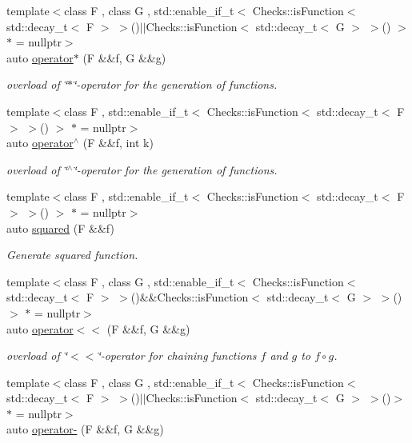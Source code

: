 \begin{DoxyCompactItemize}
{\footnotesize template$<$class F , class G , std\-::enable\-\_\-if\-\_\-t$<$ Checks\-::is\-Function$<$ std\-::decay\-\_\-t$<$ F $>$ $>$()$|$$|$\-Checks\-::is\-Function$<$ std\-::decay\-\_\-t$<$ G $>$ $>$() $>$ $\ast$  = nullptr$>$ }\\auto \hyperlink{namespaceFunG_a267562e725c73ece1c1d057b5f29511f}{operator$\ast$} (\-F \&\&f, \-G \&\&g)
\begin{DoxyCompactList}\small\item\em overload of \char`\"{}$\ast$\char`\"{}-\/operator for the generation of functions. \end{DoxyCompactList}\item 
{\footnotesize template$<$class F , std\-::enable\-\_\-if\-\_\-t$<$ Checks\-::is\-Function$<$ std\-::decay\-\_\-t$<$ F $>$ $>$() $>$ $\ast$  = nullptr$>$ }\\auto \hyperlink{namespaceFunG_a94273e3ea80324e591bb98ae3c051221}{operator$^\wedge$} (\-F \&\&f, int k)
\begin{DoxyCompactList}\small\item\em overload of \char`\"{}$^\wedge$\char`\"{}-\/operator for the generation of functions. \end{DoxyCompactList}\item 
{\footnotesize template$<$class F , std\-::enable\-\_\-if\-\_\-t$<$ Checks\-::is\-Function$<$ std\-::decay\-\_\-t$<$ F $>$ $>$() $>$ $\ast$  = nullptr$>$ }\\auto \hyperlink{namespaceFunG_ac4ffc0754104af6ddf114e154251db78}{squared} (\-F \&\&f)
\begin{DoxyCompactList}\small\item\em \-Generate squared function. \end{DoxyCompactList}\item 
{\footnotesize template$<$class F , class G , std\-::enable\-\_\-if\-\_\-t$<$ Checks\-::is\-Function$<$ std\-::decay\-\_\-t$<$ F $>$ $>$()\&\&\-Checks\-::is\-Function$<$ std\-::decay\-\_\-t$<$ G $>$ $>$() $>$ $\ast$  = nullptr$>$ }\\auto \hyperlink{namespaceFunG_a65436d4494e99629b0177d0df7634a6b}{operator$<$$<$} (\-F \&\&f, \-G \&\&g)
\begin{DoxyCompactList}\small\item\em overload of \char`\"{}$<$$<$\char`\"{}-\/operator for chaining functions $f$ and $g$ to $ f \circ g $. \end{DoxyCompactList}\item 
{\footnotesize template$<$class F , class G , std\-::enable\-\_\-if\-\_\-t$<$ Checks\-::is\-Function$<$ std\-::decay\-\_\-t$<$ F $>$ $>$()$|$$|$\-Checks\-::is\-Function$<$ std\-::decay\-\_\-t$<$ G $>$ $>$()$>$ $\ast$  = nullptr$>$ }\\auto \hyperlink{namespaceFunG_a3af04c2ef5c1b206feb75fffd298cbbf}{operator-\/} (\-F \&\&f, \-G \&\&g)

\end{DoxyCompactItemize}
